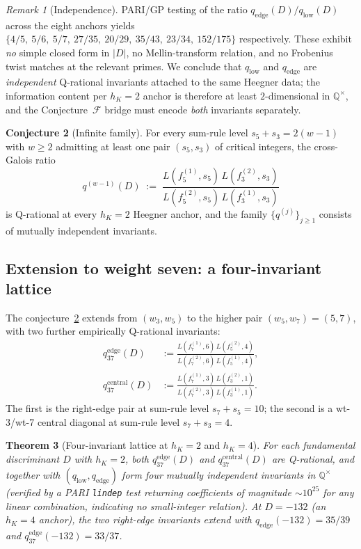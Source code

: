 \documentclass[11pt]{amsart}
\newtheorem{theorem}{Theorem}
\theoremstyle{definition}
\newtheorem{conjecture}[theorem]{Conjecture}
\theoremstyle{remark}
\newtheorem{remark}[theorem]{Remark}
\newcommand{\Q}{\mathbb{Q}}
\begin{document}
\begin{remark}[Independence]\label{rk:two-invariant-independent}
PARI/GP testing of the ratio
$q_{\mathrm{edge}}(D) / q_{\mathrm{low}}(D)$
across the eight anchors yields
$\{4/5,\ 5/6,\ 5/7,\ 27/35,\ 20/29,\ 35/43,\ 23/34,\ 152/175\}$
respectively. These exhibit \emph{no} simple closed form in $|D|$,
no Mellin-transform relation, and no Frobenius twist
matches at the relevant primes. We conclude that
$q_{\mathrm{low}}$ and $q_{\mathrm{edge}}$ are \emph{independent}
Q-rational invariants attached to the same Heegner data; the
information content per $h_K=2$ anchor is therefore at least
$2$-dimensional in $\Q^{\times}$, and the Conjecture~$\mathcal{F}$
bridge must encode \emph{both} invariants separately.
\end{remark}

\begin{conjecture}[Infinite family]\label{conj:infinite-family}
For every sum-rule level $s_5 + s_3 = 2(w-1)$ with $w \ge 2$
admitting at least one pair $(s_5, s_3)$ of critical integers,
the cross-Galois ratio
\[
q^{(w-1)}(D) \;:=\;
\frac{L(f_5^{(1)}, s_5)\,L(f_3^{(2)}, s_3)}{L(f_5^{(2)}, s_5)\,L(f_3^{(1)}, s_3)}
\]
is Q-rational at every $h_K=2$ Heegner anchor, and the family
$\{q^{(j)}\}_{j \ge 1}$ consists of mutually independent invariants.
\end{conjecture}

\subsection{Extension to weight seven: a four-invariant
lattice}\label{ss:wt7-extension}

The conjecture~\ref{conj:infinite-family} extends from $(w_3, w_5)$
to the higher pair $(w_5, w_7) = (5, 7)$, with two further
empirically Q-rational invariants:
\begin{align}
q_{37}^{\mathrm{edge}}(D) &:=
\frac{L(f_7^{(1)}, 6)\,L(f_5^{(2)}, 4)}{L(f_7^{(2)}, 6)\,L(f_5^{(1)}, 4)},
\label{eq:q37-edge}\\
q_{37}^{\mathrm{central}}(D) &:=
\frac{L(f_7^{(1)}, 3)\,L(f_3^{(2)}, 1)}{L(f_7^{(2)}, 3)\,L(f_3^{(1)}, 1)}.
\label{eq:q37-central}
\end{align}
The first is the right-edge pair at sum-rule level
$s_7 + s_5 = 10$; the second is a wt-3/wt-7 central diagonal at
sum-rule level $s_7 + s_3 = 4$.

\begin{theorem}[Four-invariant lattice at $h_K = 2$ and $h_K = 4$]
\label{thm:four-invariant}
For each fundamental discriminant $D$ with $h_K = 2$, both
$q_{37}^{\mathrm{edge}}(D)$ and $q_{37}^{\mathrm{central}}(D)$ are
Q-rational, and together with $(q_{\mathrm{low}}, q_{\mathrm{edge}})$
form four mutually independent invariants in $\Q^\times$ (verified
by a PARI \texttt{lindep} test returning coefficients of magnitude
$\sim 10^{25}$ for any linear combination, indicating no
small-integer relation). At $D = -132$ (an $h_K = 4$ anchor), the
two right-edge invariants extend with $q_{\mathrm{edge}}(-132) = 35/39$
and $q_{37}^{\mathrm{edge}}(-132) = 33/37$.
\end{theorem}
\end{document}
